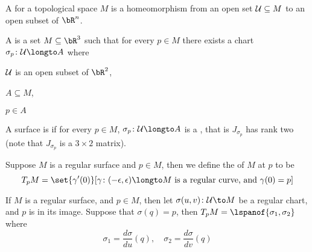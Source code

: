 \begin{defn*}

    A  for a topological space $M$ is a homeomorphism from an open set ${\cal U}\subseteq M$ to an open subset of $\bR^n$.

\end{defn*}

\begin{defn*}

    A  is a set $M\subseteq\bR^3$ such that for every $p\in M$ there exists a chart $\sigma_p\colon\mU\longto A$ where
    \benum
        \item ${\cal U}$ is an open subset of $\bR^2$,
        \item $A\subseteq M$,
        \item $p\in A$
    \eenum

    A surface is  if for every $p\in M$, $\sigma_p\colon\mU\longto A$ is a , that is $J_{\sigma_p}$ has rank two (note that $J_{\sigma_p}$ is a $3\times2$ matrix).

\end{defn*}

\begin{defn*}

    Suppose $M$ is a regular surface and $p\in M$, then we define the  of $M$ at $p$ to be
    \[ T_pM = \set{\gamma'(0)}[\gamma\colon(-\epsilon,\epsilon)\longto M\text{ is a regular curve, and }\gamma(0)=p] \]

\end{defn*}

\begin{prop*}

    If $M$ is a regular surface, and $p\in M$, then let $\sigma(u,v)\colon\mU\to M$ be a regular chart, and $p$ is in its image.
    Suppose that $\sigma(q)=p$, then $T_pM=\lspanof{\sigma_1,\sigma_2}$ where
    \[ \sigma_1 = \frac{d\sigma}{du}(q),\quad \sigma_2 = \frac{d\sigma}{dv}(q) \]

\end{prop*}

